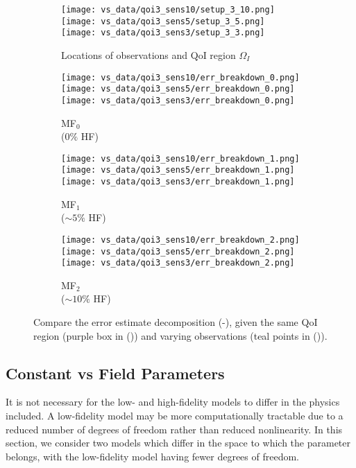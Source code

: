 \begin{figure}
\captionsetup[subfigure]{justification=centering}
\centering
  \begin{subfigure}[t]{0.20\textwidth}
  \centering
    \texttt{[image: vs\_data/qoi3\_sens10/setup\_3\_10.png]}
    \texttt{[image: vs\_data/qoi3\_sens5/setup\_3\_5.png]}
    \texttt{[image: vs\_data/qoi3\_sens3/setup\_3\_3.png]}
    \caption{Locations of observations and QoI region $\Omega_I$}
    \label{subfig:obsSetup2}
  \end{subfigure}
  \begin{subfigure}[t]{0.20\textwidth}
  \centering
    \texttt{[image: vs\_data/qoi3\_sens10/err\_breakdown\_0.png]}
    \texttt{[image: vs\_data/qoi3\_sens5/err\_breakdown\_0.png]}
    \texttt{[image: vs\_data/qoi3\_sens3/err\_breakdown\_0.png]}
    \caption{MF$_0$ \\ ($0\%$ HF)}
    \label{subfig:obsLF2}
  \end{subfigure}
  \begin{subfigure}[t]{0.20\textwidth}
  \centering
    \texttt{[image: vs\_data/qoi3\_sens10/err\_breakdown\_1.png]}
    \texttt{[image: vs\_data/qoi3\_sens5/err\_breakdown\_1.png]}
    \texttt{[image: vs\_data/qoi3\_sens3/err\_breakdown\_1.png]}
    \caption{MF$_1$ \\ ($\sim5\%$ HF)}
  \end{subfigure}
  \begin{subfigure}[t]{0.20\textwidth}
  \centering
    \texttt{[image: vs\_data/qoi3\_sens10/err\_breakdown\_2.png]}
    \texttt{[image: vs\_data/qoi3\_sens5/err\_breakdown\_2.png]}
    \texttt{[image: vs\_data/qoi3\_sens3/err\_breakdown\_2.png]}
    \caption{MF$_2$ \\ ($\sim10\%$ HF)}
    \label{subfig:obsMFlast2}
  \end{subfigure}
  \caption{Compare the error estimate decomposition (-), given the same QoI region (purple box in ()) and varying observations (teal points in ()).}
  \label{fig:dataStudy}
\end{figure}

\subsection{Constant vs Field Parameters} \label{sec:constvfield}
It is not necessary for the low- and high-fidelity models to differ in the physics included. A low-fidelity model may be more computationally tractable due to a reduced number of degrees of freedom rather than reduced nonlinearity. In this section, we consider two models which differ in the space to which the parameter belongs, with the low-fidelity model having fewer degrees of freedom.
